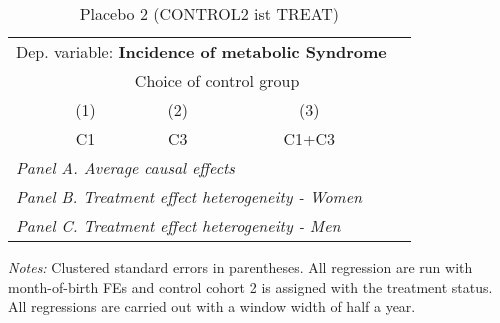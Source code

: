  \begin{table}[H] \centering \begin{threeparttable} \caption{Placebo 2 (CONTROL2 ist TREAT) } {\def\sym#1{\ifmmode^{#1}\else\(^{#1}\)\fi} \begin{tabular}{l*{4}{c}} \toprule \multicolumn{4}{l}{Dep. variable: \textbf{Incidence of metabolic Syndrome}} \\ & \multicolumn{3}{c}{Choice of control group} \\ \cmidrule(lr){2-4}
            &\multicolumn{1}{c}{(1)}&\multicolumn{1}{c}{(2)}&\multicolumn{1}{c}{(3)}\\
            &\multicolumn{1}{c}{C1}&\multicolumn{1}{c}{C3}&\multicolumn{1}{c}{C1+C3}\\
\midrule
 \multicolumn{4}{l}{\emph{Panel A. Average causal effects}} \\      \midrule\multicolumn{4}{l}{\emph{Panel B. Treatment effect heterogeneity - Women}} \\      \midrule\multicolumn{4}{l}{\emph{Panel C. Treatment effect heterogeneity - Men}} \\      
\bottomrule \end{tabular} } \begin{tablenotes} \item \scriptsize \emph{Notes:} Clustered standard errors in parentheses. All regression are run with month-of-birth FEs and control cohort 2 is assigned with the treatment status. All regressions are carried out with a window width of half a year. \end{tablenotes} \end{threeparttable} \end{table} 

